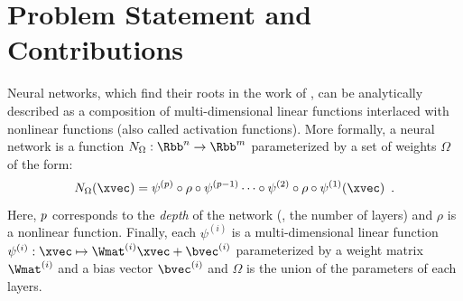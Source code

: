 \section{Problem Statement and Contributions}
\label{section:ch1-problem_statement_and_contributions}



Neural networks, which find their roots in the work of \citet{mcculloch1943logical,rosenblatt1958perceptron}, can be analytically described as a composition of multi-dimensional linear functions interlaced with nonlinear functions (also called activation functions).
More formally, a neural network is a function $N_{\Omega} : \Rbb^n \rightarrow \Rbb^m$ parameterized by a set of weights $\Omega$ of the form:
\begin{equation} \label{equation:ch1-neural_network}
  N_{\Omega}(\xvec) = \psi^{(\depth)} \circ \rho \circ \psi^{(\depth-1)} \cdots \circ \psi^{(2)} \circ \rho \circ \psi^{(1)} (\xvec) \enspace.
\end{equation}
Here, $p$ corresponds to the \emph{depth} of the network (\ie, the number of layers) and $\rho$ is a nonlinear function.
Finally, each $\psi^{(i)}$ is a multi-dimensional linear function $\psi^{(i)}: \xvec \mapsto \Wmat^{(i)} \xvec + \bvec^{(i)}$ parameterized by a weight matrix $\Wmat^{(i)}$ and a bias vector $\bvec^{(i)}$ and $\Omega$ is the union of the parameters of each layers. 



